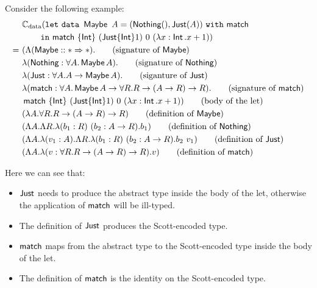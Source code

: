 Consider the following example:
\begin{align*}
  &\compiledata(\tlet\, \datatype{\Maybe}{A}{\Match}{(\Nothing (), \Just (A))}\\
  &\quad\quad \tin\, \Match\ \{\Int\}\ (\Just \{\Int\}1)\ 0\ (\lambda x: \Int . x+1))\\
  =\ &(\Lambda (\Maybe :: \Type \kindArrow \Type) . \tag{signature of $\Maybe$}\\
  &\lambda (\Nothing : \forall A . \Maybe A) . \tag{signature of $\Nothing$}\\
  &\lambda (\Just : \forall A . A \rightarrow \Maybe A) . \tag{siganture of $\Just$}\\
  &\lambda (\Match : \forall A . \Maybe A \rightarrow \forall R . R \rightarrow (A \rightarrow R) \rightarrow R). \tag{signature of $\Match$}\\
  &\Match\ \{\Int\}\ (\Just \{\Int\}1)\ 0\ (\lambda x: \Int . x+1)) \tag{body of the let}\\
  &(\lambda A . \forall R . R \rightarrow (A \rightarrow R) \rightarrow R) \tag{definition of $\Maybe$}\\
  &(\Lambda A . \Lambda R . \lambda (b_1 : R)\ (b_2 : A \rightarrow R) . b_1) \tag{definition of $\Nothing$}\\
  &(\Lambda A . \lambda (v_1 : A) . \Lambda R . \lambda (b_1 : R)\ (b_2 : A \rightarrow R) . b_2\ v_1) \tag{definition of $\Just$}\\
  &(\Lambda A . \lambda (v : \forall R . R \rightarrow (A \rightarrow R) \rightarrow R) . v) \tag{definition of $\Match$}
\end{align*}

\noindent Here we can see that:
\begin{itemize}
  \item $\operatorname{\textsf{Just}}$ needs to produce the abstract type inside the body of the let, otherwise the
    application of $\operatorname{\textsf{match}}$ will be ill-typed.
  \item The definition of $\operatorname{\textsf{Just}}$ produces the Scott-encoded type.
  \item $\operatorname{\textsf{match}}$ maps from the abstract type to the Scott-encoded type inside
    the body of the let.
  \item The definition of $\operatorname{\textsf{match}}$ is the identity on the Scott-encoded type.
\end{itemize}
